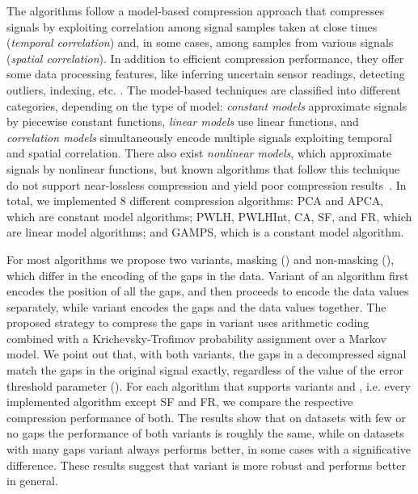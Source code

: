 The algorithms follow a model-based compression approach that compresses signals by exploiting correlation among signal samples taken at close times (\textit{temporal correlation}) and, in some cases, among samples from various signals (\textit{spatial correlation}). In addition to efficient compression performance, they offer some data processing features, like inferring uncertain sensor readings, detecting outliers, indexing, etc. \cite{AnEva2013}. The model-based techniques are classified into different categories, depending on the type of model: \textit{constant models} approximate signals by piecewise constant functions, \textit{linear models} use linear functions, and \textit{correlation models} simultaneously encode multiple signals exploiting temporal and spatial correlation. There also exist \textit{nonlinear models}, which approximate signals by nonlinear functions, but known algorithms that follow this technique do not support near-lossless compression and yield poor compression results~\cite{AnEva2013}. In total, we implemented 8 different compression algorithms: PCA and APCA, which are constant model algorithms; PWLH, PWLHInt, CA, SF, and FR, which are linear model algorithms; and GAMPS, which is a constant model algorithm.


For most algorithms we propose two variants, masking (\maskalgo) and non-masking (\NOmaskalgo), which differ in the encoding of the gaps in the data. Variant \maskalgo of an algorithm first encodes the position of all the gaps, and then proceeds to encode the data values separately, while variant \NOmaskalgo encodes the gaps and the data values together. The proposed strategy to compress the gaps in variant \maskalgo uses arithmetic coding combined with a Krichevsky-Trofimov probability assignment over a Markov model. We point out that, with both variants, the gaps in a decompressed signal match the gaps in the original signal exactly, regardless of the value of the error threshold parameter (\maxerror). For each algorithm that supports variants \maskalgo and \NOmaskalgo, i.e. every implemented algorithm except SF and FR, we compare the respective compression performance of both. The results show that on datasets with few or no gaps the performance of both variants is roughly the same, while on datasets with many gaps variant \maskalgo always performs better, in some cases with a significative difference. These results suggest that variant \maskalgo is more robust and performs better in general.


